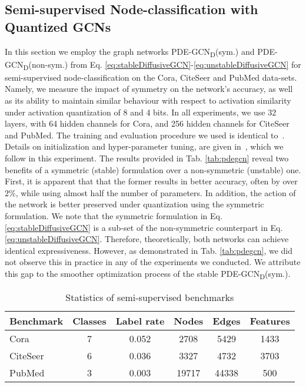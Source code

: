 \documentclass[reqno]{amsart}
\begin{document}
\subsection{\textbf{Semi-supervised Node-classification with Quantized GCNs}}
\label{sub:experiment_gcns}
In this section we employ the graph networks PDE-GCN\textsubscript{D}(sym.) and PDE-GCN\textsubscript{D}(non-sym.) from Eq. \eqref{eq:stableDiffusiveGCN}-\eqref{eq:unstableDiffusiveGCN} for semi-supervised node-classification on the Cora, CiteSeer and PubMed data-sets. 
Namely, we measure the impact of symmetry on the network's accuracy, as well as its ability to maintain similar behaviour with respect to activation similarity under activation quantization of 8 and 4 bits. 
In all experiments, we use 32 layers, with 64 hidden channels for Cora, and 256 hidden channels for CiteSeer and PubMed. The training and evaluation procedure we used is identical to~\cite{kipf2016semi}. Details on initialization and hyper-parameter tuning, are given in~\cite{eliasof2021pdegcn}, which we follow in this experiment.
The results provided in Tab. \ref{tab:pdegcn} reveal two benefits of a symmetric (stable) formulation over a non-symmetric (unstable) one. First, it is apparent that that the former results in better accuracy, often by over $2 \%$, while using almost half the number of parameters. In addition, the action of the network is better preserved under quantization using the symmetric formulation. We note that the symmetric formulation in Eq. \eqref{eq:stableDiffusiveGCN} is a sub-set of the non-symmetric counterpart in Eq. \eqref{eq:unstableDiffusiveGCN}. Therefore, theoretically, both networks can achieve identical expressiveness. However, as demonstrated in Tab. \ref{tab:pdegcn}, we did not observe this in practice in any of the experiments we conducted. We attribute this gap to the smoother optimization process of the stable PDE-GCN\textsubscript{D}(sym.).

\begin{table}
    \centering
    \begin{tabular}{lccccc}
    Benchmark & Classes & Label rate & Nodes & Edges & Features \\
    \toprule
    Cora & 7 &  0.052 & 2708 & 5429 & 1433 \\
    CiteSeer & 6 & 0.036 & 3327 & 4732 & 3703 \\
    PubMed & 3 & 0.003 & 19717 & 44338 & 500\\
    \bottomrule
    \end{tabular}
    \caption{Statistics of semi-supervised benchmarks}
    \label{tab:semisupervised_statistics}
\end{table}
\end{document}
